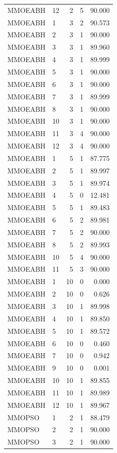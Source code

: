 \begin{longtable}{llrrr}
MMOEABH & 12 & 2 & 5 & 90.000 \\
MMOEABH & 1 & 3 & 2 & 90.573 \\
MMOEABH & 2 & 3 & 1 & 90.000 \\
MMOEABH & 3 & 3 & 1 & 89.960 \\
MMOEABH & 4 & 3 & 1 & 89.999 \\
MMOEABH & 5 & 3 & 1 & 90.000 \\
MMOEABH & 6 & 3 & 1 & 90.000 \\
MMOEABH & 7 & 3 & 1 & 89.999 \\
MMOEABH & 8 & 3 & 1 & 90.000 \\
MMOEABH & 10 & 3 & 1 & 90.000 \\
MMOEABH & 11 & 3 & 4 & 90.000 \\
MMOEABH & 12 & 3 & 4 & 90.000 \\
MMOEABH & 1 & 5 & 1 & 87.775 \\
MMOEABH & 2 & 5 & 1 & 89.997 \\
MMOEABH & 3 & 5 & 1 & 89.974 \\
MMOEABH & 4 & 5 & 0 & 12.481 \\
MMOEABH & 5 & 5 & 1 & 89.483 \\
MMOEABH & 6 & 5 & 2 & 89.981 \\
MMOEABH & 7 & 5 & 2 & 90.000 \\
MMOEABH & 8 & 5 & 2 & 89.993 \\
MMOEABH & 10 & 5 & 4 & 90.000 \\
MMOEABH & 11 & 5 & 3 & 90.000 \\
MMOEABH & 1 & 10 & 0 & 0.000 \\
MMOEABH & 2 & 10 & 0 & 0.626 \\
MMOEABH & 3 & 10 & 1 & 89.998 \\
MMOEABH & 4 & 10 & 1 & 89.850 \\
MMOEABH & 5 & 10 & 1 & 89.572 \\
MMOEABH & 6 & 10 & 0 & 0.460 \\
MMOEABH & 7 & 10 & 0 & 0.942 \\
MMOEABH & 9 & 10 & 0 & 0.001 \\
MMOEABH & 10 & 10 & 1 & 89.855 \\
MMOEABH & 11 & 10 & 1 & 89.989 \\
MMOEABH & 12 & 10 & 1 & 89.967 \\
MMOPSO & 1 & 2 & 1 & 88.479 \\
MMOPSO & 2 & 2 & 1 & 90.000 \\
MMOPSO & 3 & 2 & 1 & 90.000 \\

\end{longtable}
